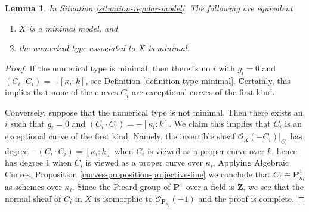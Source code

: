 \documentclass[10pt,a4paper]{amsart}
\theoremstyle{plain}
\newtheorem{lemma}[subsection]{Lemma}
\theoremstyle{definition}
\theoremstyle{remark}
\numberwithin{equation}{subsection}
\begin{document}
\begin{lemma}
\label{lemma-numerical-type-minimal-model}
In Situation \ref{situation-regular-model}. The following
are equivalent
\begin{enumerate}
\item $X$ is a minimal model, and
\item the numerical type associated to $X$ is minimal.
\end{enumerate}
\end{lemma}

\begin{proof}
If the numerical type is minimal, then there is no $i$ with
$g_i = 0$ and $(C_i \cdot C_i) = -[\kappa_i: k]$, see
Definition \ref{definition-type-minimal}.
Certainly, this implies that none of the curves $C_i$
are exceptional curves of the first kind.

\medskip\noindent
Conversely, suppose that the numerical type is not minimal.
Then there exists an $i$ such that $g_i = 0$ and
$(C_i \cdot C_i) = -[\kappa_i: k]$.
We claim this implies that $C_i$ is an exceptional curve
of the first kind. Namely, the invertible sheaf
$\mathcal{O}_X(-C_i)|_{C_i}$ has degree $-(C_i \cdot C_i) = [\kappa_i : k]$
when $C_i$ is viewed as a proper curve over $k$, hence
has degree $1$ when $C_i$ is viewed as a proper curve over $\kappa_i$.
Applying
Algebraic Curves, Proposition \ref{curves-proposition-projective-line}
we conclude that $C_i \cong \mathbf{P}^1_{\kappa_i}$ as schemes
over $\kappa_i$. Since the Picard group of $\mathbf{P}^1$
over a field is $\mathbf{Z}$, we see that the normal sheaf
of $C_i$ in $X$ is isomorphic to $\mathcal{O}_{\mathbf{P}_{\kappa_i}}(-1)$
and the proof is complete.
\end{proof}
\end{document}
